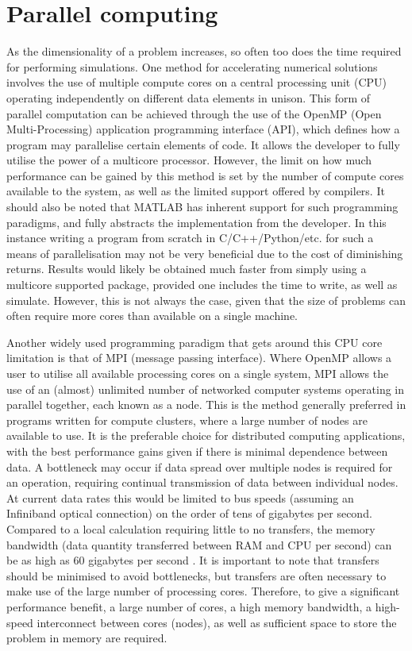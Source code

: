 \section{Parallel computing}

As the dimensionality of a problem increases, so often too does the time required for performing simulations. One method for accelerating numerical solutions involves the use of multiple compute cores on a central processing unit (CPU) operating independently on different data elements in unison. This form of parallel computation can be achieved through the use of the OpenMP (Open Multi-Processing) application programming interface (API), which defines how a program may parallelise certain elements of code. It allows the developer to fully utilise the power of a multicore processor. However, the limit on how much performance can be gained by this method is set by the number of compute cores available to the system, as well as the limited support offered by compilers. It should also be noted that \textsc{MATLAB} has inherent support for such programming paradigms, and fully abstracts the implementation from the developer. In this instance writing a program from scratch in C/C++/Python/etc. for such a means of parallelisation may not be very beneficial due to the cost of diminishing returns. Results would likely be obtained much faster from simply using a multicore supported package, provided one includes the time to write, as well as simulate. However, this is not always the case, given that the size of problems can often require more cores than available on a single machine.

Another widely used programming paradigm that gets around this CPU core limitation is that of MPI (message passing interface). Where OpenMP allows a user to utilise all available processing cores on a single system, MPI allows the use of an (almost) unlimited number of networked computer systems operating in parallel together, each known as a node. This is the method generally preferred in programs written for compute clusters, where a large number of nodes are available to use. It is the preferable choice for distributed computing applications, with the best performance gains given if there is minimal dependence between data. A bottleneck may occur if data spread over multiple nodes is required for an operation, requiring continual transmission of data between individual nodes. At current data rates this would be limited to bus speeds (assuming an Infiniband optical connection) on the order of tens of gigabytes per second. Compared to a local calculation requiring little to no transfers, the memory bandwidth (data quantity transferred between RAM and CPU per second) can be as high as 60 gigabytes per second \cite{DAT:Intel_xeon}. It is important to note that transfers should be minimised to avoid bottlenecks, but transfers are often necessary to make use of the large number of processing cores. Therefore, to give a significant performance benefit, a large number of cores, a high memory bandwidth, a high-speed interconnect between cores (nodes), as well as sufficient space to store the problem in memory are required.

